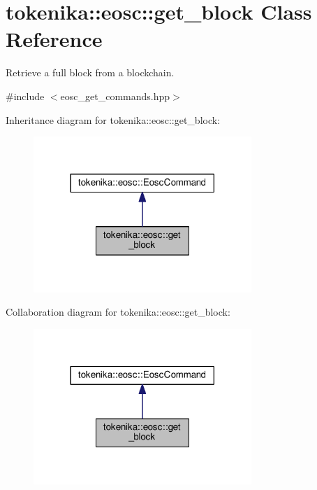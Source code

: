 \hypertarget{classtokenika_1_1eosc_1_1get__block}{}\section{tokenika\+:\+:eosc\+:\+:get\+\_\+block Class Reference}
\label{classtokenika_1_1eosc_1_1get__block}


Retrieve a full block from a blockchain.  




{\ttfamily \#include $<$eosc\+\_\+get\+\_\+commands.\+hpp$>$}



Inheritance diagram for tokenika\+:\+:eosc\+:\+:get\+\_\+block\+:\nopagebreak
\begin{figure}[H]
\begin{center}
\leavevmode
\includegraphics[width=234pt]{classtokenika_1_1eosc_1_1get__block__inherit__graph}
\end{center}
\end{figure}


Collaboration diagram for tokenika\+:\+:eosc\+:\+:get\+\_\+block\+:\nopagebreak
\begin{figure}[H]
\begin{center}
\leavevmode
\includegraphics[width=234pt]{classtokenika_1_1eosc_1_1get__block__coll__graph}
\end{center}
\end{figure}
